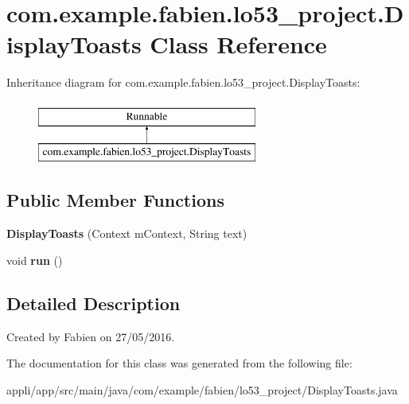 \hypertarget{classcom_1_1example_1_1fabien_1_1lo53__project_1_1DisplayToasts}{\section{com.\-example.\-fabien.\-lo53\-\_\-project.\-Display\-Toasts Class Reference}
\label{classcom_1_1example_1_1fabien_1_1lo53__project_1_1DisplayToasts}
}
Inheritance diagram for com.\-example.\-fabien.\-lo53\-\_\-project.\-Display\-Toasts\-:\begin{figure}[H]
\begin{center}
\leavevmode
\includegraphics[height=2.000000cm]{classcom_1_1example_1_1fabien_1_1lo53__project_1_1DisplayToasts}
\end{center}
\end{figure}
\subsection*{Public Member Functions}
\begin{DoxyCompactItemize}
\item 
\hypertarget{classcom_1_1example_1_1fabien_1_1lo53__project_1_1DisplayToasts_a8161863a82db4f434348d4a977b3099e}{{\bfseries Display\-Toasts} (Context m\-Context, String text)}\label{classcom_1_1example_1_1fabien_1_1lo53__project_1_1DisplayToasts_a8161863a82db4f434348d4a977b3099e}

\item 
\hypertarget{classcom_1_1example_1_1fabien_1_1lo53__project_1_1DisplayToasts_a84a5d7dc4f9da4c7cf28e15c3f43b805}{void {\bfseries run} ()}\label{classcom_1_1example_1_1fabien_1_1lo53__project_1_1DisplayToasts_a84a5d7dc4f9da4c7cf28e15c3f43b805}

\end{DoxyCompactItemize}


\subsection{Detailed Description}
Created by Fabien on 27/05/2016. 

The documentation for this class was generated from the following file\-:\begin{DoxyCompactItemize}
\item 
appli/app/src/main/java/com/example/fabien/lo53\-\_\-project/Display\-Toasts.\-java\end{DoxyCompactItemize}
